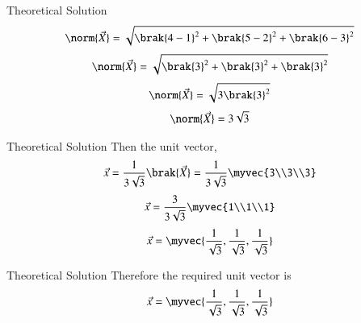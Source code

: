 \documentclass{beamer}
\begin{document}
    \begin{frame}{Theoretical Solution}
        \begin{align}
             \norm{\vec{X}}=\sqrt{\brak{4-1}^2+\brak{5-2}^2+\brak{6-3}^2}
         \end{align}
         \begin{align}
             \norm{\vec{X}}=\sqrt{\brak{3}^2+\brak{3}^2+\brak{3}^2}
         \end{align}
         \begin{align}
             \norm{\vec{X}}=\sqrt{3\brak{3}^2}
         \end{align}
         \begin{align}
             \norm{\vec{X}}=3\sqrt{3}
         \end{align}
    \end{frame}
    \begin{frame}{Theoretical Solution}
        Then the unit vector,\\
         \begin{align}
             \vec{x}=\frac{1}{3\sqrt{3}}\brak{\vec{X}}=\frac{1}{3\sqrt{3}}\myvec{3\\3\\3}
         \end{align}
         \begin{align}
             \vec{x}=\frac{3}{3\sqrt{3}}\myvec{1\\1\\1}
         \end{align}
         \begin{align}
             \vec{x}=\myvec{\frac{1}{\sqrt{3}},\frac{1}{\sqrt{3}},\frac{1}{\sqrt{3}}}
         \end{align}
    \end{frame}
    \begin{frame}{Theoretical Solution}
        Therefore the required unit vector is\\
         \begin{align*}
             \vec{x}=\myvec{\frac{1}{\sqrt{3}},\frac{1}{\sqrt{3}},\frac{1}{\sqrt{3}}}
         \end{align*}
    \end{frame}
	
\end{document}

